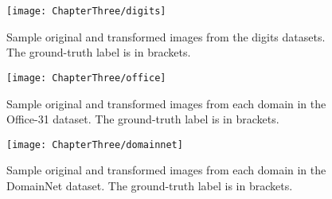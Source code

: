 \begin{figure}[h!]
	\texttt{[image: ChapterThree/digits]}
	\caption{Sample original and transformed images from the digits datasets. The ground-truth label is in brackets.}
	\label{fig:digits_samples}
\end{figure}
\begin{figure}[h!]
	\texttt{[image: ChapterThree/office]}
	\caption{Sample original and transformed images from each domain in the Office-31 dataset. The ground-truth label is in brackets.}
	\label{fig:office_samples}
\end{figure}
\begin{figure}[h!]
	\texttt{[image: ChapterThree/domainnet]}
	\caption{Sample original and transformed images from each domain in the DomainNet dataset. The ground-truth label is in brackets.}
	\label{fig:domainnet_samples}
\end{figure}
